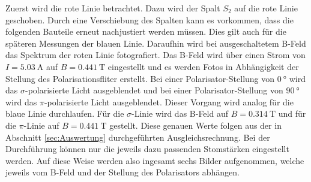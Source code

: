 Zuerst wird die rote Linie betrachtet. Dazu wird der Spalt $S_2$ auf die rote Linie geschoben. Durch eine Verschiebung des Spalten kann es vorkommen, dass die folgenden Bauteile erneut nachjustiert werden müssen. Dies gilt auch für die späteren Messungen der blauen Linie.
Daraufhin wird bei ausgeschaltetem B-Feld das Spektrum der roten Linie fotografiert. Das B-Feld wird über einen Strom von $I=\SI{5.03}{\ampere}$ auf $B=\SI{0.441}{\tesla}$ eingestellt und es werden Fotos in Abhängigkeit der Stellung des Polarisationsfliter erstellt. Bei einer Polarisator-Stellung von $\SI{0}{\degree}$ wird das $\sigma$-polarisierte Licht ausgeblendet und bei einer Polarisator-Stellung von $\SI{90}{\degree}$ wird das $\pi$-polarisierte Licht ausgeblendet.
Dieser Vorgang wird analog für die blaue Linie durchlaufen. Für die $\sigma$-Linie wird das B-Feld auf $B=\SI{0.314}{\tesla}$ und für die $\pi$-Linie auf $B=\SI{0.441}{\tesla}$ gestellt. Diese genauen Werte folgen aus der in Abschnitt \ref{sec:Auswertung} durchgeführten Ausgleichsrechnung. Bei der Durchführung können nur die jeweils dazu passenden Stomstärken eingestellt werden. Auf diese Weise werden also ingesamt sechs Bilder aufgenommen, welche jeweils vom B-Feld und der Stellung des Polarisators abhängen.


